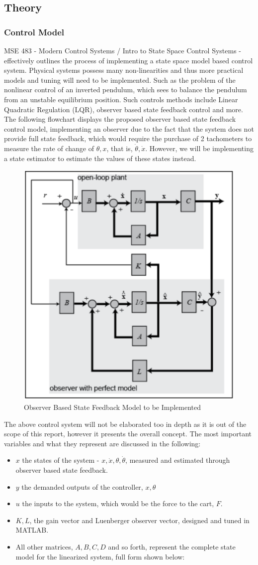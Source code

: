 \documentclass[12pt]{article}
\begin{document}
\subsection{Theory}
\label{theory}
\subsubsection{Control Model}
MSE 483 - Modern Control Systems / Intro to State Space Control Systems - effectively outlines the process of implementing a state space model based control system. Physical systems possess many non-linearities and thus more practical models and tuning will need to be implemented. Such as the problem of the nonlinear control of an inverted pendulum, which sees to balance the pendulum from an unstable equilibrium position. Such controls methods include Linear Quadratic Regulation (LQR), observer based state feedback control and more. The following flowchart displays the proposed observer based state feedback control model, implementing an observer due to the fact that the system does not provide full state feedback, which would require the purchase of 2 tachometers to measure the rate of change of $\theta, x$, that is, $\dot{\theta}, \dot{x}$. However, we will be implementing a state estimator to estimate the values of these states instead.
\begin{figure}[H]
    \centering
    \includegraphics[width=.5\linewidth]{figures/flow.png}
    \caption{Observer Based State Feedback Model to be Implemented \cite{inv2}}
    \label{fig:fc}
\end{figure}
The above control system will not be elaborated too in depth as it is out of the scope of this report, however it presents the overall concept. The most important variables and what they represent are discussed in the following:
\begin{itemize}
    \item $x$ the states of the system - $x, \dot{x}, \theta, \dot{\theta}$, measured and estimated through observer based state feedback.
    \item $y$ the demanded outputs of the controller, $x, \theta$
    \item $u$ the inputs to the system, which would be the force to the cart, $F$.
    \item $K, L$, the gain vector and Luenberger observer vector, designed and tuned in MATLAB.
    \item All other matrices, $A, B, C, D$ and so forth, represent the complete state model for the linearized system, full form shown below:
\end{itemize}
\end{document}

